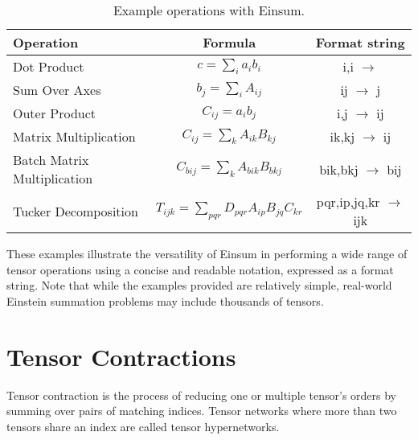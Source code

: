 \begin{table}[hbp]
    \caption{Example operations with Einsum.}
    \label{tab:einsum:ops}
    \centering
    \def\arraystretch{1.1}
    \begin{tabular}{lcc}
        \toprule
        \textbf{Operation}                 & \textbf{Formula}                                    & \textbf{Format string}         \\
        \midrule
        Dot Product                        & $c = \sum_{i} a_{i} b_{i}$                          & i,i $\rightarrow$              \\
        Sum Over Axes                      & $b_{j} = \sum_{i} A_{ij}$                           & ij $\rightarrow$ j             \\
        Outer Product                      & $C_{ij} = a_{i} b_{j}$                              & i,j $\rightarrow$ ij           \\
        Matrix Multiplication              & $C_{ij} = \sum_{k} A_{ik} B_{kj}$                   & ik,kj $\rightarrow$ ij         \\
        Batch Matrix Multiplication        & $C_{bij} = \sum_{k} A_{bik} B_{bkj}$                & bik,bkj $\rightarrow$ bij      \\
        Tucker Decomposition \cite{tucker} & $T_{ijk} = \sum_{pqr} D_{pqr} A_{ip} B_{jq} C_{kr}$ & pqr,ip,jq,kr $\rightarrow$ ijk \\
        \bottomrule
    \end{tabular}
\end{table}

\noindent
These examples illustrate the versatility of Einsum in performing a wide range of
tensor operations using a concise and readable notation, expressed as a format string.
Note that while the examples provided are relatively simple, real-world Einstein
summation problems may include thousands of tensors.

\section{Tensor Contractions}
\label{sec:tensor:contractions}
Tensor contraction is the process of reducing one or multiple tensor's orders by summing
over pairs of matching indices. Tensor networks where more than two tensors share an index
are called tensor hypernetworks.


